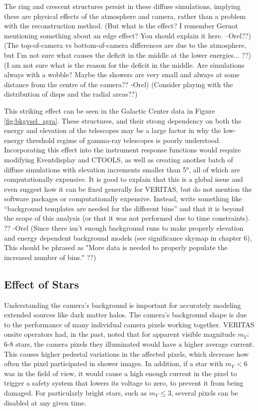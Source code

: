     The ring and crescent structures persist in these diffuse simulations, implying these are physical effects of the atmosphere and camera, rather than a problem with the reconstruction method.
    {\color{red}(But what is the effect? I remember Gernot mentioning something about an edge effect? You should explain it here. --Orel??)}
    {\color{red}(The top-of-camera vs bottom-of-camera differences are due to the atmosphere, but I'm not sure what causes the deficit in the middle at the lower energies... ??)}
    {\color{red}(I am not sure what is the reason for the deficit in the middle. Are simulations always with a wobble? Maybe the showers are very small and always at some distance from the centre of the camera?? -Orel)}
    {\color{red}(Consider playing with the distribution of disps and the radial areas??)}

    This striking effect can be seen in the Galactic Center data in Figure \ref{fig:bkgvsel_sgra}.
    These structures, and their strong dependency on both the energy and elevation of the telescopes may be a large factor in why the low-energy threshold regime of gamma-ray telescopes is poorly understood.
    Incorporating this effect into the instrument response functions would require modifying Eventdisplay and CTOOLS, as well as creating another batch of diffuse simulations with elevation increments smaller than \ang{5}, all of which are computationally expensive.
    {\color{red}It is good to explain that this is a global issue and even suggest how it can be fixed generally for VERITAS, but do not mention the software packages or computationally expensive. Instead, write something like “background templates are needed for the different bins” and that it is beyond the scope of this analysis (or that it was not performed due to time constraints). ?? -Orel}
    {\color{red}(Since there isn't enough background runs to make properly elevation and energy dependent background models (see significance skymap in chapter 6), This should be phrased as "More data is needed to properly populate the increased number of bins." ??)}
  
  \FloatBarrier

  \subsection{Effect of Stars}
    Understanding the camera's background is important for accurately modeling extended sources like dark matter halos.
    The camera's background shape is due to the performance of many individual camera pixels working together.
    VERITAS onsite operators had, in the past, noted that for apparent visible magnitude $m_V :$ 6-8 stars, the camera pixels they illuminated would have a higher average current.
    This causes higher pedestal variations in the affected pixels, which decrease how often the pixel participated in shower images.
    In addition, if a star with $m_V < 6$ was in the field of view, it would cause a high enough current in the pixel to trigger a safety system that lowers its voltage to zero, to prevent it from being damaged.
    For particularly bright stars, such as $m_V \leq 3$, several pixels can be disabled at any given time.

